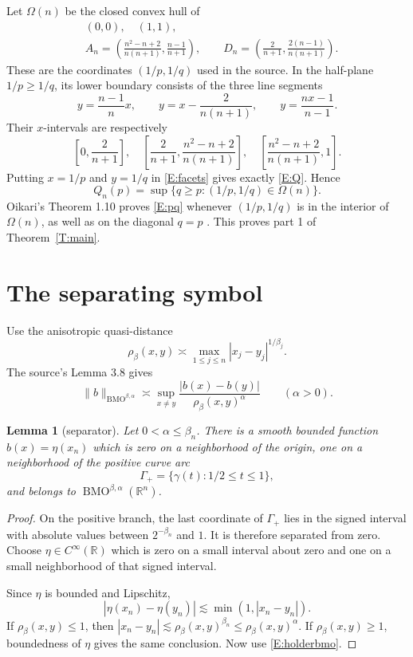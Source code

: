 \documentclass[11pt]{article}
\newtheorem{lemma}[theorem]{Lemma}
\newcommand{\R}{\mathbb R}
\newcommand{\BMO}{\operatorname{BMO}}
\begin{document}
Let $\Omega(n)$ be the closed convex hull of
\begin{align*}
 &(0,0),\quad (1,1),\\
 &A_n=\left(\frac{n^2-n+2}{n(n+1)},\frac{n-1}{n+1}\right),\qquad
 D_n=\left(\frac{2}{n+1},\frac{2(n-1)}{n(n+1)}\right).
\end{align*}
These are the coordinates $(1/p,1/q)$ used in the source.  In the half-plane
$1/p\ge1/q$, its lower boundary consists of the three line segments
\begin{equation}\label{E:facets}
 y=\frac{n-1}{n}x,\qquad
 y=x-\frac{2}{n(n+1)},\qquad
 y=\frac{nx-1}{n-1}.
\end{equation}
Their $x$-intervals are respectively
\[
 \left[0,\frac{2}{n+1}\right],\quad
 \left[\frac{2}{n+1},\frac{n^2-n+2}{n(n+1)}\right],\quad
 \left[\frac{n^2-n+2}{n(n+1)},1\right].
\]
Putting $x=1/p$ and $y=1/q$ in \eqref{E:facets} gives exactly
\eqref{E:Q}.  Hence
\begin{equation}\label{E:vertical}
 Q_n(p)=\sup\{q\ge p:(1/p,1/q)\in\Omega(n)\}.
\end{equation}
Oikari's Theorem 1.10 proves \eqref{E:pq} whenever
$(1/p,1/q)$ is in the interior of $\Omega(n)$, as well as on the diagonal
$q=p$ \cite{Oikari}.  This proves part 1 of Theorem~\ref{T:main}.

\section{The separating symbol}

Use the anisotropic quasi-distance
\[
 \rho_\beta(x,y)\asymp\max_{1\le j\le n}|x_j-y_j|^{1/\beta_j}.
\]
The source's Lemma 3.8 gives
\begin{equation}\label{E:holderbmo}
 \|b\|_{\BMO^{\beta,\alpha}}\asymp
 \sup_{x\ne y}\frac{|b(x)-b(y)|}{\rho_\beta(x,y)^\alpha}
 \qquad(\alpha>0).
\end{equation}

\begin{lemma}[separator]\label{L:separator}
Let $0<\alpha\le\beta_n$.  There is a smooth bounded function
$b(x)=\eta(x_n)$ which is zero on a neighborhood of the origin, one on a
neighborhood of the positive curve arc
\[
 \Gamma_+=\{\gamma(t):1/2\le t\le1\},
\]
and belongs to $\BMO^{\beta,\alpha}(\R^n)$.
\end{lemma}

\begin{proof}
On the positive branch, the last coordinate of $\Gamma_+$ lies in the signed
interval with absolute values between $2^{-\beta_n}$ and $1$.  It is therefore
separated from zero.  Choose $\eta\in C^\infty(\R)$ which is zero on a small
interval about zero and one on a small neighborhood of that signed interval.

Since $\eta$ is bounded and Lipschitz,
\[
 |\eta(x_n)-\eta(y_n)|\lesssim\min(1,|x_n-y_n|).
\]
If $\rho_\beta(x,y)\le1$, then
$|x_n-y_n|\lesssim\rho_\beta(x,y)^{\beta_n}\le
\rho_\beta(x,y)^\alpha$.  If $\rho_\beta(x,y)\ge1$, boundedness of $\eta$
gives the same conclusion.  Now use \eqref{E:holderbmo}.
\end{proof}
\end{document}
